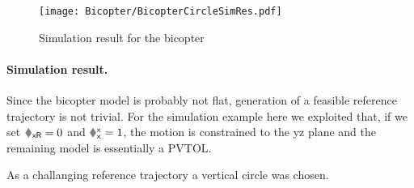 \begin{figure}[p]
 \centering
 \texttt{[image: Bicopter/BicopterCircleSimRes.pdf]}
 \caption{Simulation result for the bicopter}
 \label{fig:BicopterCircleSimRes}
\end{figure}


\paragraph{Simulation result.}
Since the bicopter model is probably not flat, generation of a feasible reference trajectory is not trivial. 
For the simulation example here we exploited that, if we set $\rRx = 0$ and $\Rxx=1$, the motion is constrained to the yz plane and the remaining model is essentially a PVTOL.

As a challanging reference trajectory a vertical circle was chosen.


